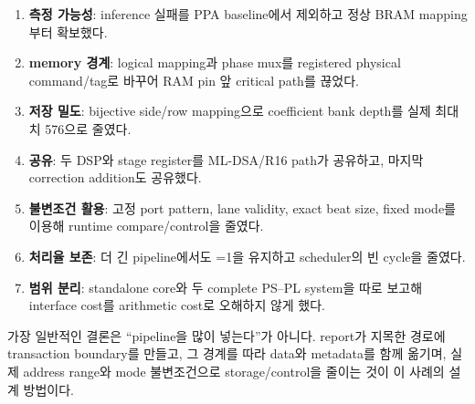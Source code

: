 \begin{enumerate}
  \item \textbf{측정 가능성}: inference 실패를 PPA baseline에서 제외하고 정상
        BRAM mapping부터 확보했다.
  \item \textbf{memory 경계}: logical mapping과 phase mux를 registered physical
        command/tag로 바꾸어 RAM pin 앞 critical path를 끊었다.
  \item \textbf{저장 밀도}: bijective side/row mapping으로 coefficient bank depth를
        실제 최대치 576으로 줄였다.
  \item \textbf{공유}: 두 DSP와 stage register를 ML-DSA/R16 path가 공유하고,
        마지막 correction addition도 공유했다.
  \item \textbf{불변조건 활용}: 고정 port pattern, lane validity, exact beat size,
        fixed mode를 이용해 runtime compare/control을 줄였다.
  \item \textbf{처리율 보존}: 더 긴 pipeline에서도 \ii=1을 유지하고 scheduler의
        빈 cycle을 줄였다.
  \item \textbf{범위 분리}: standalone core와 두 complete PS--PL system을 따로
        보고해 interface cost를 arithmetic cost로 오해하지 않게 했다.
\end{enumerate}

가장 일반적인 결론은 ``pipeline을 많이 넣는다''가 아니다. report가 지목한
경로에 transaction boundary를 만들고, 그 경계를 따라 data와 metadata를 함께
옮기며, 실제 address range와 mode 불변조건으로 storage/control을 줄이는 것이
이 사례의 설계 방법이다.
